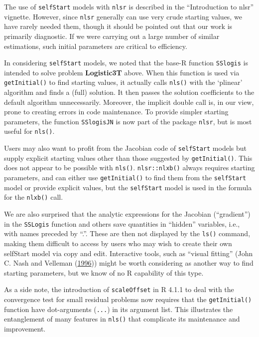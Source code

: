 \documentclass[
]{article}
\begin{document}
The use of \texttt{selfStart} models with \texttt{nlsr} is described in
the ``Introduction to nlsr'' vignette. However, since \texttt{nlsr}
generally can use very crude starting values, we have rarely needed
them, though it should be pointed out that our work is primarily
diagnostic. If we were carrying out a large number of similar
estimations, such initial parameters are critical to efficiency.

In considering \texttt{selfStart} models, we noted that the base-R
function \texttt{SSlogis} is intended to solve problem
\textbf{Logistic3T} above. When this function is used via
\texttt{getInitial()} to find starting values, it actually calls
\texttt{nls()} with the `plinear' algorithm and finds a (full) solution.
It then passes the solution coefficients to the default algorithm
unnecessarily. Moreover, the implicit double call is, in our view, prone
to creating errors in code maintenance. To provide simpler starting
parameters, the function \texttt{SSlogisJN} is now part of the package
\texttt{nlsr}, but is most useful for \texttt{nls()}.

Users may also want to profit from the Jacobian code of
\texttt{selfStart} models but supply explicit starting values other than
those suggested by \texttt{getInitial()}. This does not appear to be
possible with \texttt{nls()}. \texttt{nlsr::nlxb()} always requires
starting parameters, and can either use \texttt{getInitial()} to find
them from the \texttt{selfStart} model or provide explicit values, but
the \texttt{selfStart} model is used in the formula for the
\texttt{nlxb()} call.

We are also surprised that the analytic expressions for the Jacobian
(``gradient'') in the \texttt{SSLogis} function and others save
quantities in ``hidden'' variables, i.e., with names preceded by ``.''.
These are then not displayed by the \texttt{ls()} command, making them
difficult to access by users who may wish to create their own selfStart
model via copy and edit. Interactive tools, such as ``visual fitting''
(John C. Nash and Velleman
(\protect\hyperlink{ref-nash1996nonlinear}{1996})) might be worth
considering as another way to find starting parameters, but we know of
no R capability of this type.

As a side note, the introduction of \texttt{scaleOffset} in R 4.1.1 to
deal with the convergence test for small residual problems now requires
that the \texttt{getInitial()} function have dot-arguments
(\texttt{...}) in its argument list. This illustrates the entanglement
of many features in \texttt{nls()} that complicate its maintenance and
improvement.
\end{document}
